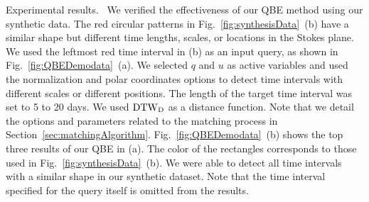 \textsf{Experimental results.\ } We verified the effectiveness of our QBE method using our synthetic data.
The red circular patterns in Fig.~\ref{fig:synthesisData}~(b) have a similar shape but different time lengths, scales, or locations in the Stokes plane.
We used the leftmost red time interval in (b) as an input query, as shown in Fig.~\ref{fig:QBEDemodata}~(a).
We selected $q$ and $u$ as active variables and used the normalization and polar coordinates options to detect time intervals with different scales or different positions.
The length of the target time interval was set to 5 to 20 days.
We used $\rm{DTW}_{\rm D}$ as a distance function.
Note that we detail the options and parameters related to the matching process in Section~\ref{sec:matchingAlgorithm}.
Fig.~\ref{fig:QBEDemodata}~(b) shows the top three results of our QBE in (a).
The color of the rectangles corresponds to those used in Fig.~\ref{fig:synthesisData}~(b).
We were able to detect all time intervals with a similar shape in our synthetic dataset.
Note that the time interval specified for the query itself is omitted from the results.

